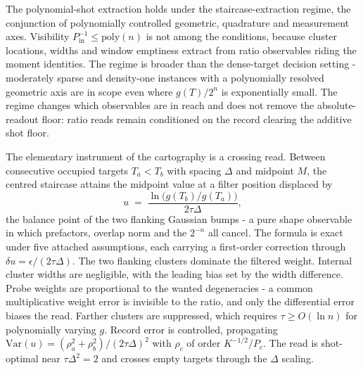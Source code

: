The polynomial-shot extraction holds under the staircase-extraction regime, the conjunction of polynomially controlled geometric, quadrature and measurement axes. Visibility $P_{\mathrm{in}}^{-1} \le \mathrm{poly}(n)$ is not among the conditions, because cluster locations, widths and window emptiness extract from ratio observables riding the moment identities. The regime is broader than the dense-target decision setting - moderately sparse and density-one instances with a polynomially resolved geometric axis are in scope even where $g(T)/2^n$ is exponentially small. The regime changes which observables are in reach and does not remove the absolute-readout floor: ratio reads remain conditioned on the record clearing the additive shot floor.

The elementary instrument of the cartography is a crossing read. Between consecutive occupied targets $T_a < T_b$ with spacing $\Delta$ and midpoint $M$, the centred staircase attains the midpoint value at a filter position displaced by
\[
u \;=\; \frac{\ln\bigl(g(T_b)/g(T_a)\bigr)}{2\tau\Delta},
\]
the balance point of the two flanking Gaussian bumps - a pure shape observable in which prefactors, overlap norm and the $2^{-n}$ all cancel. The formula is exact under five attached assumptions, each carrying a first-order correction through $\delta u = \epsilon/(2\tau\Delta)$. The two flanking clusters dominate the filtered weight. Internal cluster widths are negligible, with the leading bias set by the width difference. Probe weights are proportional to the wanted degeneracies - a common multiplicative weight error is invisible to the ratio, and only the differential error biases the read. Farther clusters are suppressed, which requires $\tau \ge O(\ln n)$ for polynomially varying $g$. Record error is controlled, propagating $\mathrm{Var}(u) = (\rho_a^2 + \rho_b^2)/(2\tau\Delta)^2$ with $\rho_c$ of order $K^{-1/2}/P_c$. The read is shot-optimal near $\tau\Delta^2 = 2$ and crosses empty targets through the $\Delta$ scaling.


